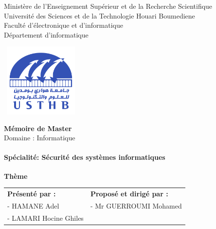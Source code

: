 \documentclass[12pt , a4paper]{report}
\begin{document}
	\begin{center}
		\normalsize{Ministère de l'Enseignement Supérieur et de la Recherche Scientifique}\\
		\normalsize{Université des Sciences et de la Technologie Houari Boumediene}\\
		\normalsize{Faculté d'électronique et d'informatique}\\
		\normalsize{Département d'informatique}\\
	\end{center}
	\begin{center}
		\includegraphics[width=4cm,height=3.7cm]{usthb.png}
	\end{center}
	
	
	\begin{center}
		\Huge{\textbf{Mémoire de Master}}\\
		\large{Domaine : Informatique}\\
		\textbf{}\\
		\large{\textbf{Spécialité: Sécurité des systèmes informatiques}}\\
		\textbf{}\\
		\bigskip
		\vspace*{1cm}
		\normalsize{\textbf{Thème}}
	\end{center}
	\vspace*{1.5cm}
	
	\begin{table}[h]
		\center
		\begin{tabular}{p{8cm}p{6.5cm}}
			\textbf{Présenté par :} & \textbf{Proposé et dirigé par :}\\
			- HAMANE Adel  & -	Mr GUERROUMI Mohamed\\
			- LAMARI Hocine Ghiles \\
		\end{tabular}
	\end{table}
	
\end{document}
